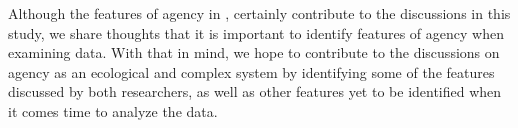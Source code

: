 Although the features of agency in \textcite{mercer2012}, \textcite{larsen2019,mairitsch2023} certainly contribute to the discussions in this study, we share  thoughts that it is important to identify features of agency when examining data. With that in mind, we hope to contribute to the discussions on agency as an ecological and complex system by identifying some of the features discussed by both researchers, as well as other features yet to be identified when it comes time to analyze the data.
